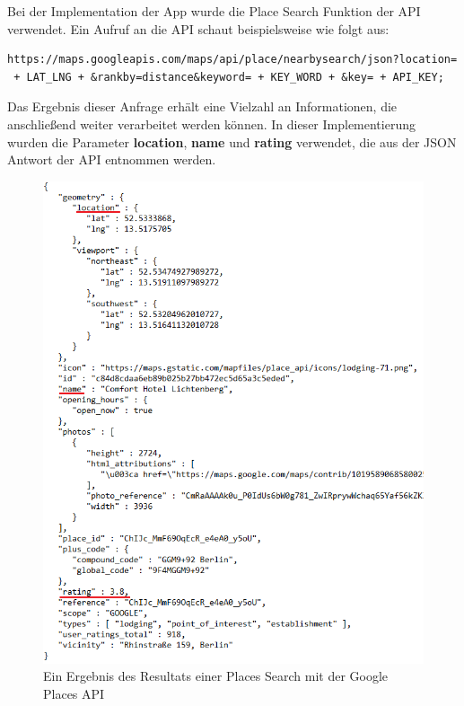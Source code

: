 Bei der Implementation der App wurde die \glqq Place Search\grqq{} Funktion der API verwendet. Ein Aufruf an die API schaut beispielsweise wie folgt aus:

\begin{lstlisting}[basicstyle=\small]
https://maps.googleapis.com/maps/api/place/nearbysearch/json?location=
 + LAT_LNG + &rankby=distance&keyword= + KEY_WORD + &key= + API_KEY;
\end{lstlisting}

Das Ergebnis dieser Anfrage erhält eine Vielzahl an Informationen, die anschließend weiter verarbeitet werden können. In dieser Implementierung wurden die Parameter \textbf{location}, \textbf{name} und \textbf{rating} verwendet, die aus der JSON Antwort der API entnommen werden.

\begin{figure}[H]
	\centering
	\includegraphics[scale=0.75]{location_result.png}
	\caption{Ein Ergebnis des Resultats einer Places Search mit der Google Places API}
\end{figure} 


